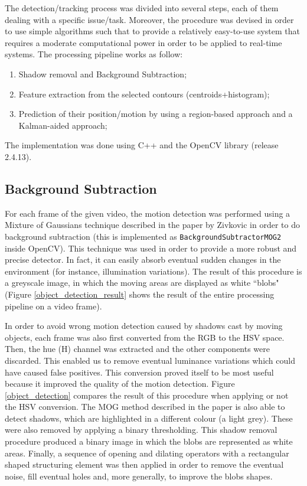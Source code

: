 \documentclass[runningheads]{llncs}
\begin{document}
The detection/tracking process was divided into several steps, each of them dealing with a specific issue/task. Moreover, the procedure was devised in order to use simple algorithms such that to provide a relatively easy-to-use system that requires a moderate computational power in order to be applied to real-time systems. The processing pipeline works as follow:
\begin{enumerate}
\item Shadow removal and Background Subtraction;
\item Feature extraction from the selected contours (centroids+histogram);
\item Prediction of their position/motion by using a region-based approach and a Kalman-aided approach;
\end{enumerate}
The implementation was done using C++ and the OpenCV library (release 2.4.13).

\subsection{Background Subtraction}
For each frame of the given video, the motion detection was performed using a Mixture of Gaussians technique described in the paper by Zivkovic \cite{Mog} in order to do background subtraction (this is implemented as \texttt{BackgroundSubtractorMOG2}\cite{backgroundsubtractormog} inside OpenCV). This technique was used in order to provide a more robust and precise detector. In fact, it can easily absorb eventual sudden changes in the environment (for instance, illumination variations). The result of this procedure is a greyscale image, in which the moving areas are displayed as white ``blobs" (Figure \ref{object_detection_result} shows the result of the entire processing pipeline on a video frame).
\smallskip

In order to avoid wrong motion detection caused by shadows cast by moving objects, each frame was also first converted from the RGB to the HSV space. Then, the hue (H) channel was extracted and the other components were discarded. This enabled us to remove eventual luminance variations which could have caused false positives.
This conversion proved itself to be most useful because it improved the quality of the motion detection. Figure \ref{object_detection} compares the result of this procedure when applying or not the HSV conversion.
The MOG method described in the paper is also able to detect shadows, which are highlighted in a different colour (a light grey). These were also removed by applying a binary thresholding. This shadow removal procedure produced a binary image in which the blobs are represented as white areas. 
Finally,  a sequence of opening and dilating operators with a rectangular shaped structuring element was then applied in order to remove the eventual noise, fill eventual holes and, more generally, to improve the blobs shapes.
\smallskip
\end{document}

